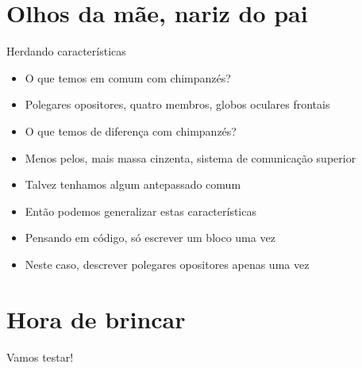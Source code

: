 \documentclass[14pt]{beamer}
\subtitle{Eu sou seu pai}
\begin{document}
	
	\begin{frame}
		\titlepage
	\end{frame}

	\begin{frame}
		\tableofcontents
	\end{frame}

	\section{Olhos da mãe, nariz do pai}
		\begin{frame}{Herdando características}
			\begin{itemize}
				\presentationPause\item O que temos em comum com chimpanzés?
				\presentationPause\item Polegares opositores\presentationPause, quatro membros\presentationPause, globos oculares frontais
				\presentationPause\item O que temos de diferença com chimpanzés?
				\presentationPause\item Menos pelos\presentationPause, mais massa cinzenta\presentationPause, sistema de comunicação superior
				\presentationPause\item Talvez tenhamos algum antepassado comum
				\presentationPause\item Então podemos generalizar estas características
				\presentationPause\item Pensando em código\presentationPause, só escrever um bloco uma vez
				\presentationPause\item Neste caso, descrever polegares opositores apenas uma vez
			\end{itemize}
		\end{frame}

	\section{Hora de brincar}
		\begin{frame}
			\begin{center}\Huge
				Vamos testar!
			\end{center}
		\end{frame}
	
\end{document}
